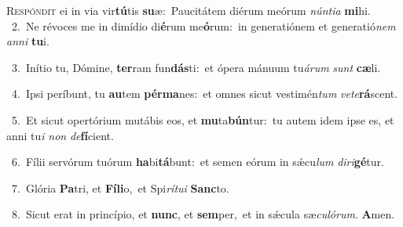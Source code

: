 \lettrine{\initial\textcolor{\initialcolor}{R}}{espóndit} ei in via vir\-\textbf{tú}\-tis \textbf{su}\-æ:~\star Paucitátem diérum meórum \textit{nún}\-\textit{ti}\textit{a} \textbf{mi}\-hi.\\
{\numbfont\textcolor{\numbcolor}{~2.}}~Ne révoces me in dimídio di\-\textbf{é}\-rum me\-\textbf{ó}\-rum:~\star in generatiónem et generatió\textit{nem} \textit{an}\-\textit{ni} \textbf{tu}\-i.\par
{\numbfont\textcolor{\numbcolor}{~3.}}~Inítio tu, Dómine, \textbf{ter}\-ram fun\-\textbf{dás}\-ti:~\star et ópera mánuum tu\-\textit{á}\-\textit{rum} \textit{sunt} \textbf{cæ}\-li.\par
{\numbfont\textcolor{\numbcolor}{~4.}}~Ipsi períbunt, tu \textbf{au}\-tem \textbf{pér}\-\textbf{ma}nes:~\star et omnes sicut vestimén\textit{tum} \textit{ve}\-\textit{te}\textbf{rá}scent.\par
{\numbfont\textcolor{\numbcolor}{~5.}}~Et sicut opertórium mutábis eos, et \textbf{mu}\-ta\-\textbf{bún}\-tur:~\star tu autem idem ipse es, et anni tu\textit{i} \textit{non} \textit{de}\-\textbf{fí}cient.\par
{\numbfont\textcolor{\numbcolor}{~6.}}~Fílii servórum tuórum \textbf{ha}\-bi\-\textbf{tá}\-bunt:~\star et semen eórum in sǽcu\textit{lum} \textit{di}\-\textit{ri}\textbf{gé}tur.\par
{\numbfont\textcolor{\numbcolor}{~7.}}~Glória \textbf{Pa}\-tri, et \textbf{Fí}\-\textbf{li}o,~\star et Spi\-\textit{rí}\-\textit{tu}\textit{i} \textbf{Sanc}\-to.\par
{\numbfont\textcolor{\numbcolor}{~8.}}~Sicut erat in princípio, et \textbf{nunc}\-, et \textbf{sem}\-per,~\star et in sǽcula sæ\-\textit{cu}\-\textit{ló}\textit{rum}. \textbf{A}\-men.\par
